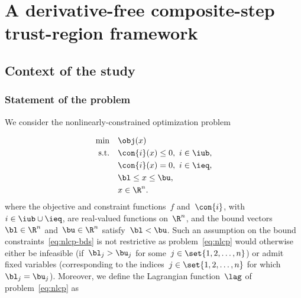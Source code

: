 \chapter{A derivative-free composite-step trust-region  framework}

\section{Context of the study}

\subsection{Statement of the problem}

We consider the nonlinearly-constrained optimization problem

\begin{subequations}
    \label{eq:nlcp}
    \begin{align}
        \min        & \quad \obj(x) \label{eq:nlcp-obj}\\
        \text{s.t.} & \quad \con{i}(x) \le 0, ~ i \in \iub, \label{eq:nlcp-cub}\\
                    & \quad \con{i}(x) = 0, ~ i \in \ieq, \label{eq:nlcp-ceq}\\
                    & \quad \bl \le x \le \bu, \label{eq:nlcp-bds}\\
                    & \quad x \in \R^n. \nonumber
    \end{align}
\end{subequations}
%
%
%
%
where the objective and constraint functions~$f$ and~$\con{i}$, with~$i \in \iub \cup \ieq$, are real-valued functions on~$\R^n$, and the bound vectors~$\bl \in \R^n$ and~$\bu \in \R^n$ satisfy~$\bl < \bu$.
Such an assumption on the bound constraints~\eqref{eq:nlcp-bds} is not restrictive as problem~\eqref{eq:nlcp} would otherwise either be infeasible (if~$\bl_j > \bu_j$ for some~$j \in \set{1, 2, \dots, n}$) or admit fixed variables (corresponding to the indices~$j \in \set{1, 2, \dots, n}$ for which~$\bl_j = \bu_j$).
Moreover, we define the Lagrangian function~$\lag$ of problem~\eqref{eq:nlcp} as

